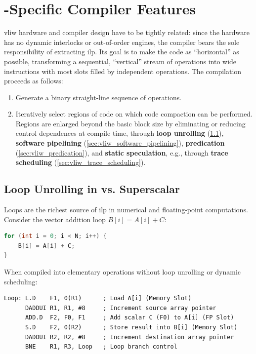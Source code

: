 \section{-Specific Compiler Features}
\label{sec:vliw_compiler_features}

\gls{vliw} hardware and compiler design have to be tightly related: since the hardware has no dynamic interlocks or out-of-order engines, the compiler bears the sole responsibility of extracting \gls{ilp}. Its goal is to make the code as ``horizontal'' as possible, transforming a sequential, ``vertical'' stream of operations into wide instructions with most slots filled by independent operations. The compilation proceeds as follows:
\begin{enumerate}
    \item Generate a binary straight-line sequence of operations.
    \item Iteratively select regions of code on which code compaction can be performed. Regions are enlarged beyond the basic block size by eliminating or reducing control dependences at compile time, through \textbf{loop unrolling} (\cref{sec:vliw_loop_unrolling}), \textbf{software pipelining} (\cref{sec:vliw_software_pipelining}), \textbf{predication} (\cref{sec:vliw_predication}), and \textbf{static speculation}, e.g., through \textbf{trace scheduling} (\cref{sec:vliw_trace_scheduling}).
\end{enumerate}

\subsection{Loop Unrolling in  vs. Superscalar}
\label{sec:vliw_loop_unrolling}

Loops are the richest source of \gls{ilp} in numerical and floating-point computations. Consider the vector addition loop $B[i] = A[i] + C$:

\begin{lstlisting}[language=C, caption={Baseline Vector Addition Loop}]
for (int i = 0; i < N; i++) {
    B[i] = A[i] + C;
}
\end{lstlisting}

When compiled into elementary operations without loop unrolling or dynamic scheduling:
\begin{lstlisting}[language={}, caption={Assembly Representation of Baseline Loop}]
Loop: L.D    F1, 0(R1)      ; Load A[i] (Memory Slot)
      DADDUI R1, R1, #8     ; Increment source array pointer
      ADD.D  F2, F0, F1     ; Add scalar C (F0) to A[i] (FP Slot)
      S.D    F2, 0(R2)      ; Store result into B[i] (Memory Slot)
      DADDUI R2, R2, #8     ; Increment destination array pointer
      BNE    R1, R3, Loop   ; Loop branch control
\end{lstlisting}

